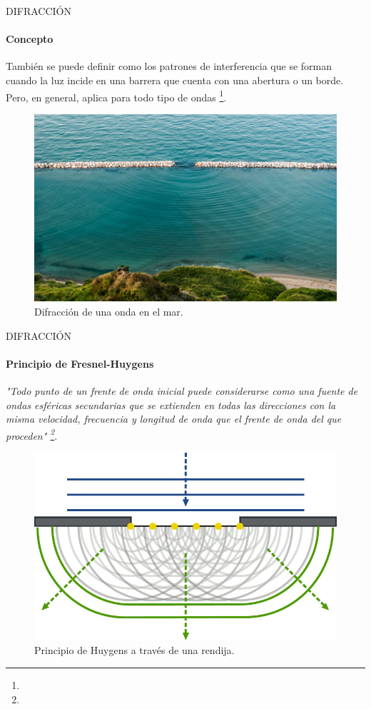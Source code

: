 \begin{frame}{DIFRACCIÓN}
    \framesubtitle{Concepto}
    También se puede definir como los patrones de interferencia que se forman cuando la luz incide en una barrera que cuenta con una abertura o un borde. Pero, en general, aplica para todo tipo de ondas \footnote{}.
    \begin{figure}[H]
		\centering
		\includegraphics[scale=0.35]{david/waterwave.jpg}
		\caption{Difracción de una onda en el mar\footnotemark{}.}
	\end{figure}
    \vspace{-1cm}
\end{frame}

\begin{frame}{DIFRACCIÓN}
    \framesubtitle{Principio de Fresnel-Huygens}
    \textit{"Todo punto de un frente de onda inicial puede considerarse como una fuente de ondas esféricas secundarias que se extienden en todas las direcciones con la misma velocidad, frecuencia y longitud de onda que el frente de onda del que proceden" \footnote{}}.
    \begin{figure}
        \includegraphics[scale=0.53]{david/huygens.pdf}
        \caption{Principio de Huygens a través de una rendija.}
    \end{figure}
\end{frame}


